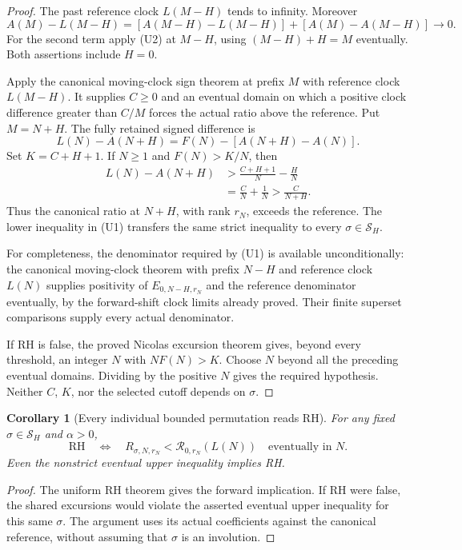 \documentclass[11pt]{article}
\newtheorem{corollary}[theorem]{Corollary}
\theoremstyle{definition}
\begin{document}
\begin{proof}
The past reference clock $L(M-H)$ tends to infinity. Moreover
\[
 A(M)-L(M-H)
 =[A(M-H)-L(M-H)]+[A(M)-A(M-H)]\longrightarrow0.
\]
For the second term apply (U2) at $M-H$, using
$(M-H)+H=M$ eventually. Both assertions include $H=0$.

Apply the canonical moving-clock sign theorem at prefix $M$ with
reference clock $L(M-H)$. It supplies $C\ge0$ and an eventual domain
on which a positive clock difference greater than $C/M$ forces the
actual ratio above the reference. Put $M=N+H$.
The fully retained signed difference is
\[
 L(N)-A(N+H)=F(N)-[A(N+H)-A(N)].
\]
Set $K=C+H+1$. If $N\ge1$ and $F(N)>K/N$, then
\[
 \begin{split}
 L(N)-A(N+H)
 &>\frac{C+H+1}{N}-\frac HN\\
 &=\frac CN+\frac1N
   >\frac C{N+H}.
 \end{split}
\]
Thus the canonical ratio at $N+H$, with rank $r_N$, exceeds the
reference. The lower inequality in (U1) transfers the same strict
inequality to every $\sigma\in\mathcal S_H$.

For completeness, the denominator required by (U1) is available
unconditionally: the canonical moving-clock theorem with prefix $N-H$
and reference clock $L(N)$ supplies positivity of
$E_{0,N-H,r_N}$ and the reference denominator eventually, by the
forward-shift clock limits already proved. Their finite superset
comparisons supply every actual denominator.

If RH is false, the proved Nicolas excursion theorem gives, beyond
every threshold, an integer $N$ with $NF(N)>K$.
Choose $N$ beyond all the preceding eventual domains.
Dividing by the positive $N$ gives the required hypothesis.
Neither $C$, $K$, nor the selected cutoff depends on $\sigma$.
\end{proof}

\begin{corollary}[Every individual bounded permutation reads RH]
For any fixed $\sigma\in\mathcal S_H$ and $\alpha>0$,
\[
 \mathrm{RH}
 \quad\Longleftrightarrow\quad
 R_{\sigma,N,r_N}<\mathcal R_{0,r_N}(L(N))
                      \quad\text{eventually in }N.
\]
Even the nonstrict eventual upper inequality implies RH.
\end{corollary}

\begin{proof}
The uniform RH theorem gives the forward implication.
If RH were false, the shared excursions would violate the asserted
eventual upper inequality for this same $\sigma$.
The argument uses its actual coefficients against the canonical
reference, without assuming that $\sigma$ is an involution.
\end{proof}
\end{document}
